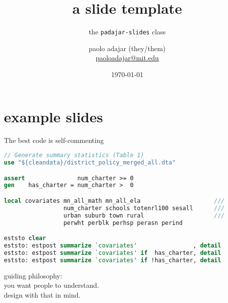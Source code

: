 \documentclass[aspectratio=169, handout, sectionslides]{padajar-slides} %
\title{a slide template}
\subtitle{the \texttt{padajar-slides} class}
\date{\today}
\author{paolo adajar (they/them) \\ \href{mailto:paoloadajar@mit.edu}{paoloadajar@mit.edu}}
\institute{v1.0}
\begin{document}
\maketitle


\section{example slides}

\begin{frame}[fragile]{The best code is self-commenting}
\begin{lstlisting}[language=Stata,
linebackgroundcolor={
	\btLstHL{1, 13}}
]
// Generate summary statistics (Table 1)
use "${cleandata}/district_policy_merged_all.dta"

assert               num_charter >= 0
gen    has_charter = num_charter >  0

local covariates mn_all_math mn_all_ela                   	///
                 num_charter schools totenrl100 sesall    	///
                 urban suburb town rural                  	///
                 perwht perblk perhsp perasn perind

eststo clear
eststo: estpost summarize `covariates'                , detail
eststo: estpost summarize `covariates' if  has_charter, detail
eststo: estpost summarize `covariates' if !has_charter, detail \end{lstlisting}
\end{frame}

\begin{frame}
	\raggedright
	guiding philosophy: \\
	you want people to \alert{understand}. \\
	design with that in mind.
\end{frame}

\def\sym#1{\ifmmode^{#1}\else\(^{#1}\)\fi}
\end{document}
